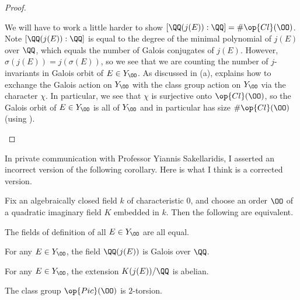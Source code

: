 \documentclass[../notes.tex]{subfiles}
\begin{document}
\begin{proof}
\begin{listalph}
		We will have to work a little harder to show $[\QQ(j(E)):\QQ]=\#\op{Cl}(\OO)$. Note $[\QQ(j(E)):\QQ]$ is equal to the degree of the minimal polynomial of $j(E)$ over $\QQ$, which equals the number of Galois conjugates of $j(E)$. However, $\sigma(j(E))=j(\sigma(E))$, so we see that we are counting the number of $j$-invariants in Galois orbit of $E\in Y_\OO$. As discussed in (a),  explains how to exchange the Galois action on $Y_\OO$ with the class group action on $Y_\OO$ via the character $\chi$. In particular, we see that $\chi$ is surjective onto $\op{Cl}(\OO)$, so the Galois orbit of $E\in Y_\OO$ is all of $Y_\OO$ and in particular has size $\#\op{Cl}(\OO)$ (using ).
		\qedhere
	\end{listalph}
\end{proof}
In private communication with Professor Yiannis Sakellaridis, I asserted an incorrect version of the following corollary. Here is what I think is a corrected version.
\begin{corollary}
	Fix an algebraically closed field $k$ of characteristic $0$, and choose an order $\OO$ of a quadratic imaginary field $K$ embedded in $k$. Then the following are equivalent.
	\begin{listroman}
		\item The fields of definition of all $E\in Y_{\OO}$ are all equal.
		\item For any $E\in Y_{\OO}$, the field $\QQ(j(E))$ is Galois over $\QQ$.
		\item For any $E\in Y_\OO$, the extension $K(j(E))/\QQ$ is abelian.
		\item The class group $\op{Pic}(\OO)$ is $2$-torsion.
	\end{listroman}
\end{corollary}
\end{document}
